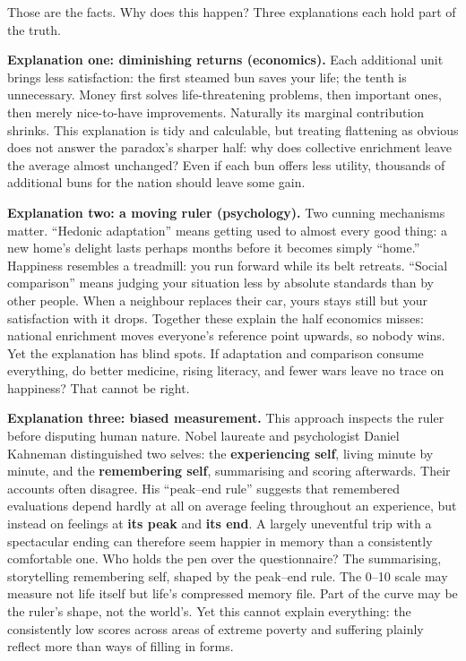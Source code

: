 Those are the facts. Why does this happen? Three explanations each hold part of the truth.

\textbf{Explanation one: diminishing returns (economics).} Each additional unit brings less satisfaction: the first steamed bun saves your life; the tenth is unnecessary. Money first solves life-threatening problems, then important ones, then merely nice-to-have improvements. Naturally its marginal contribution shrinks. This explanation is tidy and calculable, but treating flattening as obvious does not answer the paradox's sharper half: why does collective enrichment leave the average almost unchanged? Even if each bun offers less utility, thousands of additional buns for the nation should leave some gain.

\textbf{Explanation two: a moving ruler (psychology).} Two cunning mechanisms matter. ``Hedonic adaptation'' means getting used to almost every good thing: a new home's delight lasts perhaps months before it becomes simply ``home.'' Happiness resembles a treadmill: you run forward while its belt retreats. ``Social comparison'' means judging your situation less by absolute standards than by other people. When a neighbour replaces their car, yours stays still but your satisfaction with it drops. Together these explain the half economics misses: national enrichment moves everyone's reference point upwards, so nobody wins. Yet the explanation has blind spots. If adaptation and comparison consume everything, do better medicine, rising literacy, and fewer wars leave no trace on happiness? That cannot be right.

\textbf{Explanation three: biased measurement.} This approach inspects the ruler before disputing human nature. Nobel laureate and psychologist Daniel Kahneman distinguished two selves: the \textbf{experiencing self}, living minute by minute, and the \textbf{remembering self}, summarising and scoring afterwards. Their accounts often disagree. His ``peak--end rule'' suggests that remembered evaluations depend hardly at all on average feeling throughout an experience, but instead on feelings at \textbf{its peak} and \textbf{its end}. A largely uneventful trip with a spectacular ending can therefore seem happier in memory than a consistently comfortable one. Who holds the pen over the questionnaire? The summarising, storytelling remembering self, shaped by the peak--end rule. The 0--10 scale may measure not life itself but life's compressed memory file. Part of the curve may be the ruler's shape, not the world's. Yet this cannot explain everything: the consistently low scores across areas of extreme poverty and suffering plainly reflect more than ways of filling in forms.

